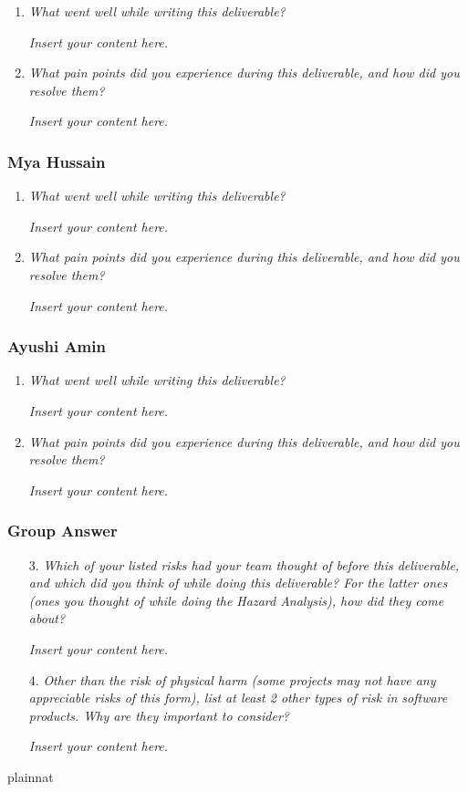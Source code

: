 \documentclass{article}
\newcommand{\lips}{\textit{Insert your content here.}}
\begin{document}
\begin{enumerate}
  \item \textit{What went well while writing this deliverable?}
  
  \lips

  \item \textit{What pain points did you experience during this deliverable, and how did you resolve them?}
  
  \lips

\end{enumerate}

\subsubsection*{Mya Hussain}

\begin{enumerate}
  \item \textit{What went well while writing this deliverable?}
  
  \lips

  \item \textit{What pain points did you experience during this deliverable, and how did you resolve them?}
  
  \lips

\end{enumerate}

\subsubsection*{Ayushi Amin}

\begin{enumerate}
  \item \textit{What went well while writing this deliverable?}
  
  \lips

  \item \textit{What pain points did you experience during this deliverable, and how did you resolve them?}
  
  \lips

\end{enumerate}

\subsubsection*{Group Answer}

\begin{enumerate}
    \item[3.] \textit{Which of your listed risks had your team thought of before this deliverable, and which did you think of while doing this deliverable? For the latter ones (ones you thought of while doing the Hazard Analysis), how did they come about?}
    
    \lips

    \item[4.] \textit{Other than the risk of physical harm (some projects may not have any appreciable risks of this form),
    list at least 2 other types of risk in software products. Why are they important to consider?}

    \lips

\end{enumerate}

 {plainnat}

\end{document}
